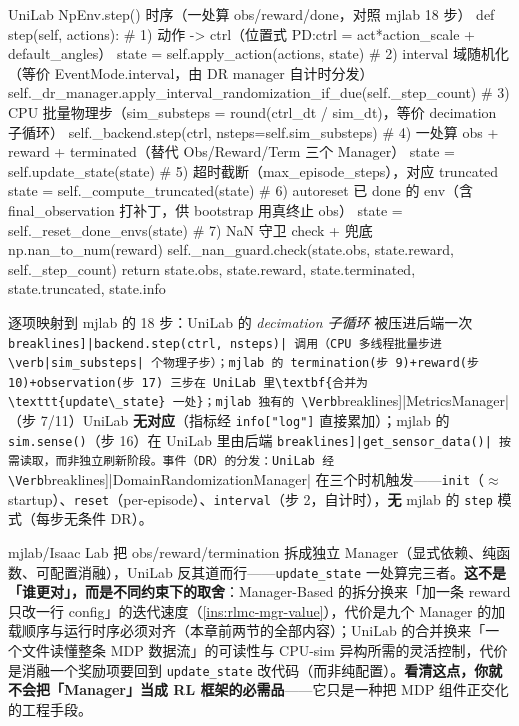\begin{codebox}[Python]{UniLab NpEnv.step() 时序（一处算 obs/reward/done，对照 mjlab 18 步）}
def step(self, actions):
    # 1) 动作 -> ctrl（位置式 PD:ctrl = act*action_scale + default_angles）
    state = self.apply_action(actions, state)
    # 2) interval 域随机化（等价 EventMode.interval，由 DR manager 自计时分发）
    self._dr_manager.apply_interval_randomization_if_due(self._step_count)
    # 3) CPU 批量物理步（sim_substeps = round(ctrl_dt / sim_dt)，等价 decimation 子循环）
    self._backend.step(ctrl, nsteps=self.sim_substeps)
    # 4) 一处算 obs + reward + terminated（替代 Obs/Reward/Term 三个 Manager）
    state = self.update_state(state)
    # 5) 超时截断（max_episode_steps），对应 truncated
    state = self._compute_truncated(state)
    # 6) autoreset 已 done 的 env（含 final_observation 打补丁，供 bootstrap 用真终止 obs）
    state = self._reset_done_envs(state)
    # 7) NaN 守卫 check + 兜底 np.nan_to_num(reward)
    self._nan_guard.check(state.obs, state.reward, self._step_count)
    return state.obs, state.reward, state.terminated, state.truncated, state.info
\end{codebox}

逐项映射到 mjlab 的 18 步：UniLab 的 \emph{decimation 子循环} 被压进后端一次 \Verb[breaklines]|backend.step(ctrl, nsteps)| 调用（CPU 多线程批量步进 \verb|sim_substeps| 个物理子步）；mjlab 的 termination(步 9)+reward(步 10)+observation(步 17) 三步在 UniLab 里\textbf{合并为 \texttt{update\_state} 一处}；mjlab 独有的 \Verb[breaklines]|MetricsManager|（步 7/11）UniLab \textbf{无对应}（指标经 \verb|info["log"]| 直接累加）；mjlab 的 \verb|sim.sense()|（步 16）在 UniLab 里由后端 \Verb[breaklines]|get_sensor_data()| 按需读取，而非独立刷新阶段。事件（DR）的分发：UniLab 经 \Verb[breaklines]|DomainRandomizationManager| 在三个时机触发——\verb|init|（$\approx$startup）、\verb|reset|（per-episode）、\verb|interval|（步 2，自计时），\textbf{无} mjlab 的 \verb|step| 模式（每步无条件 DR）。

\begin{insight}\label{ins:rlmc-mgr-unilab}
mjlab/Isaac Lab 把 obs/reward/termination 拆成独立 Manager（显式依赖、纯函数、可配置消融），UniLab 反其道而行——\verb|update_state| 一处算完三者。\textbf{这不是「谁更对」，而是不同约束下的取舍}：Manager-Based 的拆分换来「加一条 reward 只改一行 config」的迭代速度（\cref{ins:rlmc-mgr-value}），代价是九个 Manager 的加载顺序与运行时序必须对齐（本章前两节的全部内容）；UniLab 的合并换来「一个文件读懂整条 MDP 数据流」的可读性与 CPU-sim 异构所需的灵活控制，代价是消融一个奖励项要回到 \texttt{update\_state} 改代码（而非纯配置）。\textbf{看清这点，你就不会把「Manager」当成 RL 框架的必需品}——它只是一种把 MDP 组件正交化的工程手段。
\end{insight}

